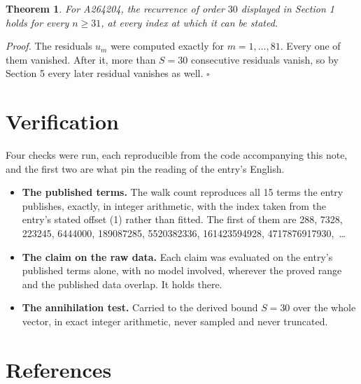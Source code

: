 \documentclass[11pt]{article}
\newtheorem{theorem}{Theorem}
\theoremstyle{definition}
\begin{document}
\begin{theorem} For A264204, the recurrence of order $30$ displayed in Section 1 holds for every $n \ge 31$, at every index at which it can be stated.\end{theorem}

{\itshape Proof.} The residuals $u_m$ were computed exactly for $m = 1,\dots,81$. Every one of them vanished. After it, more than $S = 30$ consecutive residuals vanish, so by Section 5 every later residual vanishes as well. $\square$

\section{Verification}

Four checks were run, each reproducible from the code accompanying this note, and the first two are what pin the reading of the entry's English.

\begin{itemize}

\item {\bfseries The published terms.} The walk count reproduces all 15 terms the entry publishes, exactly, in integer arithmetic, with the index taken from the entry's stated offset (1) rather than fitted. The first of them are 288, 7328, 223245, 6444000, 189087285, 5520382336, 161423594928, 4717876917930,~\dots

\item {\bfseries The claim on the raw data.} Each claim was evaluated on the entry's published terms alone, with no model involved, wherever the proved range and the published data overlap. It holds there.

\item {\bfseries The annihilation test.} Carried to the derived bound $S = 30$ over the whole vector, in exact integer arithmetic, never sampled and never truncated.

\end{itemize}

\section{References}
\end{document}

